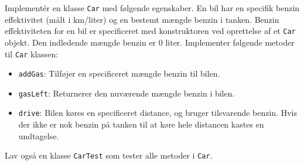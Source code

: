 Implementér en klasse \texttt{Car} med følgende egenskaber. En bil har en specifik benzin effektivitet (målt i km/liter) og en bestemt mængde benzin i tanken. Benzin effektiviteten for en bil er specificeret med konstruktoren ved oprettelse af et \texttt{Car} objekt. Den indledende mængde benzin er 0 liter. Implementer følgende metoder til \texttt{Car} klassen:
  \begin{itemize}
  \item \texttt{addGas}: Tilføjer en specificeret mængde benzin til bilen.
  \item \texttt{gasLeft}: Returnerer den nuværende mængde benzin i bilen.
  \item \texttt{drive}: Bilen køres en specificeret distance, og bruger tilsvarende benzin. Hvis der ikke er nok benzin på tanken til at køre hele distancen kastes en undtagelse.
  \end{itemize}
  Lav også en klasse \texttt{CarTest} som tester alle metoder i \texttt{Car}.
